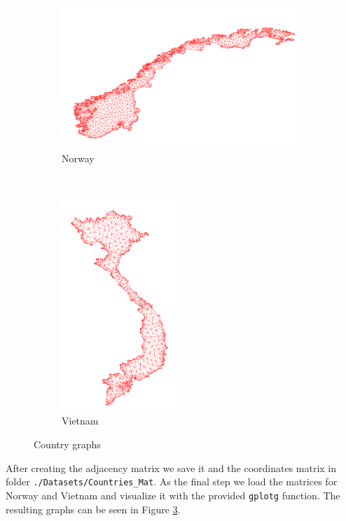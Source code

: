 \begin{figure}[H]
	\centering
	\begin{subfigure}{0.5\textwidth}
		\includegraphics[width=\textwidth]{./media/norway.png}
		\caption{Norway}
		\label{fig:no}
	\end{subfigure}%
    ~
	\begin{subfigure}{0.5\textwidth}
		\includegraphics[width=0.5\textwidth]{./media/vietnam.png}
		\caption{Vietnam}
		\label{fig:viet}
	\end{subfigure}
	\caption{Country graphs}
	\label{fig:countries}
\end{figure}
After creating the adjacency matrix we save it and the coordinates matrix in folder \texttt{./Datasets/Countries\_Mat}. As the final step we load the matrices for Norway and Vietnam and visualize it with the provided \texttt{gplotg} function. The resulting graphs can be seen in Figure \ref{fig:countries}.

